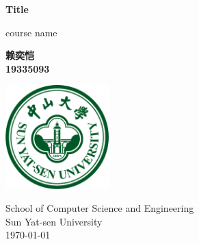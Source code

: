 \begin{titlepage}
    \begin{center}
        \vspace*{1cm}

        \Huge
        \textbf{Title}
        
        \vspace{0.5cm}
        \LARGE
        course name

        \vspace{1.5cm}
        \large
        \textbf{赖奕恺}\\
        \textbf{19335093}
        
        \vfill

        \includegraphics[width=0.3\textwidth]{Pic/university.png}

        \large
        School of Computer Science and Engineering\\
        Sun Yat-sen University\\
        \today \\

    \end{center}
\end{titlepage}